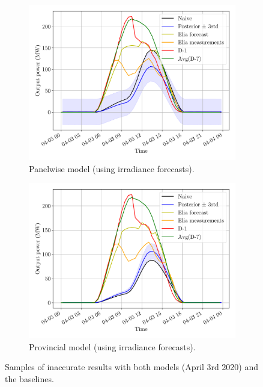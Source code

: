 \documentclass[a4paper, 12pt]{article}
\begin{document}
\begin{figure}[H]
	\centering
	\begin{subfigure}{0.48\textwidth}
		\centering
		\includegraphics[width=\textwidth]{resources/pdf/solar_panelwise (START_FOR 03-04-2020).pdf}
		\caption{Panelwise model (using irradiance forecasts).}
		\label{fig:panelwise_bad_1}
	\end{subfigure}
	\hspace{0.5em}
	\begin{subfigure}{0.48\textwidth}
		\centering
		\includegraphics[width=\textwidth]{resources/pdf/solar_provincial (START_FOR 03-04-2020).pdf}
		\caption{Provincial model (using irradiance forecasts).}
		\label{fig:provincial_bad_1}
	\end{subfigure}
	\caption{Samples of inaccurate results with both models (April 3rd 2020) and the baselines.}
	\label{fig:bad_results_april_3rd}
\end{figure}
\end{document}

